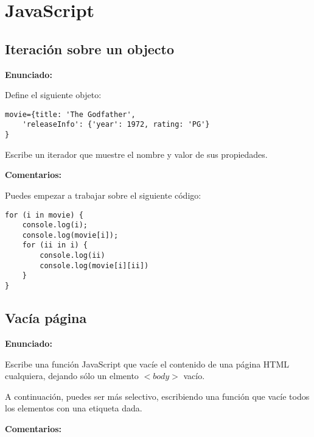 \section{JavaScript}

\subsection{Iteración sobre un objecto}
\label{subsec:eje-js-iteracion-objeto}

\textbf{Enunciado:}

Define el siguiente objeto:

\begin{verbatim}
movie={title: 'The Godfather',
    'releaseInfo': {'year': 1972, rating: 'PG'}
}
\end{verbatim}

Escribe un iterador que muestre el nombre y valor de sus propiedades.

\textbf{Comentarios:}

Puedes empezar a trabajar sobre el siguiente código:

\begin{verbatim}
for (i in movie) {
    console.log(i);
    console.log(movie[i]);
    for (ii in i) {
        console.log(ii)
        console.log(movie[i][ii])
    }
}
\end{verbatim}

\subsection{Vacía página}
\label{subsec:eje-js-vacia-pagina}

\textbf{Enunciado:}

Escribe una función JavaScript que vacíe el contenido de una página HTML cualquiera, dejando sólo un elmento $<body>$ vacío.

A continuación, puedes ser más selectivo, escribiendo una función que vacíe todos los elementos con una etiqueta dada.

\textbf{Comentarios:}

